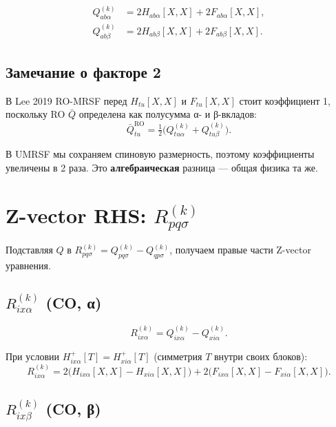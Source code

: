 \documentclass[11pt, a4paper]{article}
\theoremstyle{definition}
\newcommand{\Hp}{H^{+}}
\begin{document}
\begin{align}
    Q^{(k)}_{ab\alpha} &= 2 H_{ab\alpha}[X, X] + 2 F_{ab\alpha}[X, X], \\
    Q^{(k)}_{ab\beta} &= 2 H_{ab\beta}[X, X] + 2 F_{ab\beta}[X, X].
\end{align}

\subsection{Замечание о факторе 2}

В Lee 2019 RO-MRSF перед $H_{tu}[X, X]$ и $F_{tu}[X, X]$ стоит коэффициент 1, поскольку RO $\bar Q$ определена как полусумма α- и β-вкладов:
\begin{equation}
    \bar Q^{\text{RO}}_{tu} = \tfrac{1}{2}\bigl( Q^{(k)}_{tu\alpha} + Q^{(k)}_{tu\beta} \bigr).
\end{equation}

В UMRSF мы сохраняем спиновую размерность, поэтому коэффициенты увеличены в 2 раза. Это \textbf{алгебраическая} разница --- общая физика та же.

\section{Z-vector RHS: $R^{(k)}_{pq\sigma}$}
\label{sec:Rexplicit}

Подставляя $Q$ в $R^{(k)}_{pq\sigma} = Q^{(k)}_{pq\sigma} - Q^{(k)}_{qp\sigma}$, получаем правые части Z-vector уравнения.

\subsection{$R^{(k)}_{ix\alpha}$ (CO, α)}

$$
R^{(k)}_{ix\alpha} = Q^{(k)}_{ix\alpha} - Q^{(k)}_{xi\alpha}.
$$

При условии $\Hp_{ix\alpha}[T] = \Hp_{xi\alpha}[T]$ (симметрия $T$ внутри своих блоков):
\begin{equation}
    \boxed{R^{(k)}_{ix\alpha} = 2\bigl( H_{ix\alpha}[X, X] - H_{xi\alpha}[X, X] \bigr) + 2\bigl( F_{ix\alpha}[X, X] - F_{xi\alpha}[X, X] \bigr).}
\end{equation}

\subsection{$R^{(k)}_{ix\beta}$ (CO, β)}
\end{document}
